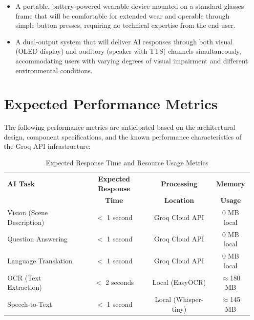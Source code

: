 \begin{itemize}[leftmargin=1.5cm]
\item A portable, battery-powered wearable device mounted on a standard glasses frame that will be comfortable for extended wear and operable through simple button presses, requiring no technical expertise from the end user.

\item A dual-output system that will deliver AI responses through both visual (OLED display) and auditory (speaker with TTS) channels simultaneously, accommodating users with varying degrees of visual impairment and different environmental conditions.
\end{itemize}

\section{Expected Performance Metrics}
The following performance metrics are anticipated based on the architectural design, component specifications, and the known performance characteristics of the Groq API infrastructure:

\begin{table}[h]
\centering
\begin{tabular}{|l|c|c|c|}
\hline
\textbf{AI Task} & \textbf{Expected Response} & \textbf{Processing} & \textbf{Memory} \\
 & \textbf{Time} & \textbf{Location} & \textbf{Usage} \\
\hline
Vision (Scene Description) & $<$ 1 second & Groq Cloud API & 0 MB local \\
\hline
Question Answering & $<$ 1 second & Groq Cloud API & 0 MB local \\
\hline
Language Translation & $<$ 1 second & Groq Cloud API & 0 MB local \\
\hline
OCR (Text Extraction) & $<$ 2 seconds & Local (EasyOCR) & $\approx$180 MB \\
\hline
Speech-to-Text & $<$ 1 second & Local (Whisper-tiny) & $\approx$145 MB \\
\hline
\end{tabular}
\caption{Expected Response Time and Resource Usage Metrics}
\end{table}

